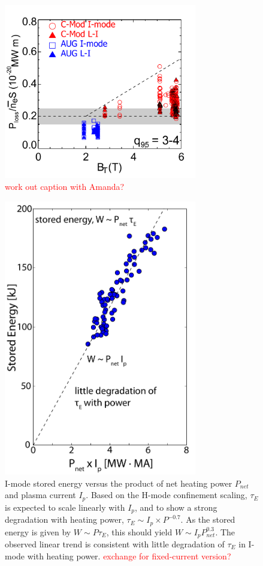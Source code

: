 \documentclass[12pt]{iopart}
\renewcommand{\note}[1]{\textcolor{red}{#1}}
\begin{document}
\begin{figure}[ht]
 \centering
 \includegraphics[width=0.75\textwidth]{Bt_Pthres_Cmod_AUG.pdf}
 \caption{\note{work out caption with Amanda?}}
 \label{fig:Bt_P}
\end{figure}

\begin{figure}[ht]
 \centering
 \includegraphics[width=0.75\textwidth]{PIp_W_scale.pdf}
 \caption{I-mode stored energy versus the product of net heating power $P_{net}$ and plasma current $I_p$.  Based on the H-mode confinement scaling, $\tau_E$ is expected to scale linearly with $I_p$, and to show a strong degradation with heating power, $\tau_E \sim I_p \times P^{-0.7}$.  As the stored energy is given by $W \sim P \tau_E$, this should yield $W \sim I_p P_{net}^{0.3}$.  The observed linear trend is consistent with little degradation of $\tau_E$ in I-mode with heating power. \note{exchange for fixed-current version?}}
 \label{fig:PIp_W}
\end{figure}
\end{document}

